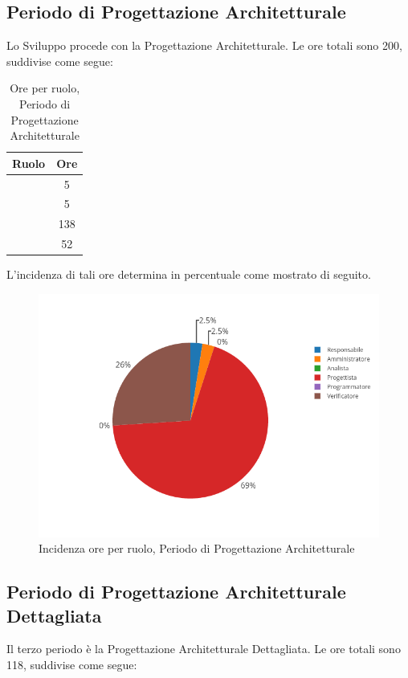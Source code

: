 \subsection{Periodo di Progettazione Architetturale}
Lo Sviluppo procede con la Progettazione Architetturale. Le ore totali sono 200, suddivise come segue:

\begin{table}[H]
	\begin{center}
		\begin{tabular}{|c|c|}
			\hline
			\textbf{Ruolo}	& \textbf{Ore} \\
			\hline
			\Res	&	5	\\
			\hline
			\Amm	&	5	\\
			\hline
			\Prog   &	138	\\
			\hline
			\Ver	&	52	\\
			\hline
		\end{tabular}
	\end{center}
	\caption{Ore per ruolo, Periodo di Progettazione Architetturale}
\end{table}

L'incidenza di tali ore determina in percentuale come mostrato di seguito.
\begin{figure}[H]
	\centering
	\includegraphics[scale=0.6]{img/ProgettazioneArchitetturale.png}
	\caption{Incidenza ore per ruolo, Periodo di Progettazione Architetturale}
\end{figure}

\subsection{Periodo di Progettazione Architetturale Dettagliata}
Il terzo periodo è la Progettazione Architetturale Dettagliata. Le ore totali sono 118, suddivise come segue:


